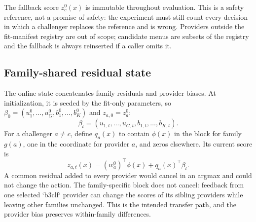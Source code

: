 \documentclass[sigconf,anonymous]{aamas}
\begin{document}
The fallback score $z_c^0(x)$ is immutable throughout evaluation. This is a safety reference, not a promise of safety: the experiment must still count every decision in which a challenger replaces the reference and is wrong. Providers outside the fit-manifest registry are out of scope; candidate menus are subsets of the registry and the fallback is always reinserted if a caller omits it.

\subsection{Family-shared residual state}
The online state concatenates family residuals and provider biases. At initialization, it is seeded by the fit-only parameters, so $\beta_0=(u_1^0,\ldots,u_G^0,b_1^0,\ldots,b_K^0)$ and $z_{a,0}=z_a^0$:
$$
\beta_t=(u_{1,t},\ldots,u_{G,t},b_{1,t},\ldots,b_{K,t}).
$$
For a challenger $a\neq c$, define $q_a(x)$ to contain $\phi(x)$ in the block for family $g(a)$, one in the coordinate for provider $a$, and zeros elsewhere. Its current score is
$$
z_{a,t}(x)=(w_a^0)^\top\phi(x)+q_a(x)^\top\beta_t.
$$
A common residual added to every provider would cancel in an argmax and could not change the action. The family-specific block does not cancel: feedback from one selected `b3clf` provider can change the scores of its sibling providers while leaving other families unchanged. This is the intended transfer path, and the provider bias preserves within-family differences.
\end{document}
